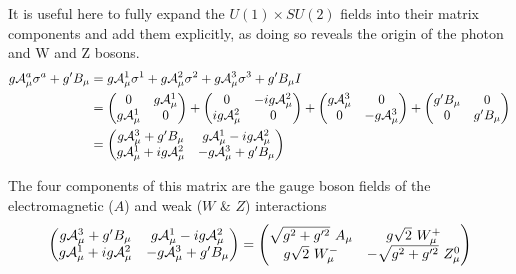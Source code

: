         It is useful here to fully expand the $U(1) \times SU(2)$ fields into their matrix components and add them explicitly,
            as doing so reveals the origin of the photon and W and Z bosons.
        \begin{equation} \begin{split}
            g \mathcal{A}^a_{\mu} \sigma^a + g' B_{\mu} & =
                g \mathcal{A}^1_{\mu} \sigma^1
                + g \mathcal{A}^2_{\mu} \sigma^2
                + g \mathcal{A}^3_{\mu} \sigma^3
                + g' B_{\mu} I \\
            & = \begin{pmatrix}
                0 & g\mathcal{A}^1_{\mu} \\ g\mathcal{A}^1_{\mu} & 0 \end{pmatrix}
                + \begin{pmatrix} 0 & -ig\mathcal{A}^2_{\mu} \\ ig\mathcal{A}^2_{\mu} & 0 \end{pmatrix}
                + \begin{pmatrix} g\mathcal{A}^3_{\mu} & 0 \\ 0 & -g\mathcal{A}^3_{\mu} \end{pmatrix}
                + \begin{pmatrix} g'B_{\mu} & 0 \\ 0 & g'B_{\mu}
            \end{pmatrix} \\
            & = \begin{pmatrix} 
                g\mathcal{A}^3_{\mu} + g'B_{\mu} & g\mathcal{A}^1_{\mu} - ig\mathcal{A}^2_{\mu} \\
                g\mathcal{A}^1_{\mu} + ig\mathcal{A}^2_{\mu} & -g\mathcal{A}^3_{\mu} + g'B_{\mu}
            \end{pmatrix}
        \end{split} \end{equation}

        The four components of this matrix are the gauge boson fields of the electromagnetic ($A$) and weak ($W$ \& $Z$) interactions
        \begin{equation} \begin{split}
            \begin{pmatrix} 
                g\wField^3_{\mu} + g'B_{\mu} & g\wField^1_{\mu} - ig\wField^2_{\mu} \\
                g\wField^1_{\mu} + ig\wField^2_{\mu} & -g\wField^3_{\mu} + g'B_{\mu}
            \end{pmatrix} =
            \begin{pmatrix} 
                \sqrt{g^2 + g^{\prime 2}}\ A_{\mu} & g \sqrt{2}\ W^+_{\mu} \\
                g \sqrt{2}\ W^-_{\mu} & - \sqrt{g^2 + g^{\prime 2}}\ Z^0_{\mu}
            \end{pmatrix}
        \end{split} \end{equation}


